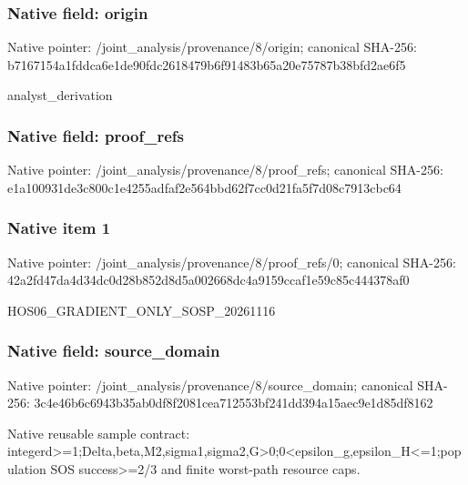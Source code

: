 \documentclass[10pt,a4paper]{article}
\begin{document}
\subsubsection{Native field: origin}
Native pointer: /joint\_\allowbreak{}analysis/provenance/8/origin; canonical SHA-256: b7167154a1fddca6e1de90fdc2618479b6f91483b65a20e75787b38bfd2ae6f5

\begingroup\raggedright\sloppy analyst\_\allowbreak{}derivation\par\endgroup

\subsubsection{Native field: proof\_\allowbreak{}refs}
Native pointer: /joint\_\allowbreak{}analysis/provenance/8/proof\_\allowbreak{}refs; canonical SHA-256: e1a100931de3c800c1e4255adfaf2e564bbd62f7cc0d21fa5f7d08c7913cbc64

\subsubsection{Native item 1}
Native pointer: /joint\_\allowbreak{}analysis/provenance/8/proof\_\allowbreak{}refs/0; canonical SHA-256: 42a2fd47da4d34dc0d28b852d8d5a002668dc4a9159ccaf1e59c85c444378af0

\begingroup\raggedright\sloppy HOS06\_\allowbreak{}GRADIENT\_\allowbreak{}ONLY\_\allowbreak{}SOSP\_\allowbreak{}20261116\par\endgroup

\subsubsection{Native field: source\_\allowbreak{}domain}
Native pointer: /joint\_\allowbreak{}analysis/provenance/8/source\_\allowbreak{}domain; canonical SHA-256: 3c4e46b6c6943b35ab0df8f2081cea712553bf241dd394a15aec9e1d85df8162

\begingroup\raggedright\sloppy Native reusable sample contract:\allowbreak{} integerd>=\allowbreak{}1;\allowbreak{}Delta,\allowbreak{}beta,\allowbreak{}M2,\allowbreak{}sigma1,\allowbreak{}sigma2,\allowbreak{}G>0;\allowbreak{}0<epsilon\_\allowbreak{}g,\allowbreak{}epsilon\_\allowbreak{}H<=\allowbreak{}1;\allowbreak{}population SOS success>=\allowbreak{}2/\allowbreak{}3 and finite worst-path resource caps.\par\endgroup
\end{document}
